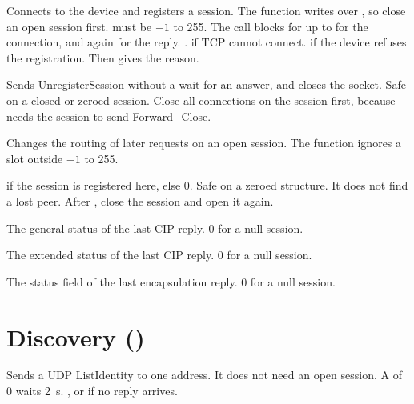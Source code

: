 Connects to the device and registers a session. The function writes over
, so close an open session first.  must be
$-1$ to 255. The call blocks for up to  for the connection,
and again for the reply.
\ret {}.  if TCP cannot connect.
 if the device refuses the registration. Then
 gives the reason.

Sends UnregisterSession without a wait for an answer, and closes the socket.
Safe on a closed or zeroed session. Close all  connections on the
session first, because  needs the session to send
Forward\_Close.

Changes the routing of later requests on an open session. The function
ignores a slot outside $-1$ to 255.

 if the session is registered here, else 0. Safe on a zeroed structure.
It does not find a lost peer. After , close the session and
open it again.

\ret The general status of the last CIP reply. 0 for a null session.

\ret The extended status of the last CIP reply. 0 for a null session.

\ret The status field of the last encapsulation reply. 0 for a null session.

\section{Discovery ()}

Sends a UDP ListIdentity to one address. It does not need an open session.
A  of 0 waits 2~s.
\ret {}, or  if no reply arrives.

